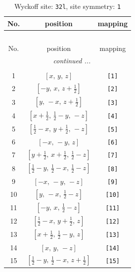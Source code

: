 \documentclass[fleqn,8pt]{jsarticle}
\begin{document}
\renewcommand{\arraystretch}{1.2}
\begin{longtable}{ccc}
\caption{Wyckoff site: {\tt 32l}, site symmetry: {\tt 1}}
 \\
 \hline \hline
No. & position & mapping \\ \hline \endfirsthead

\multicolumn{2}{l}{\tablename\ \thetable{}} \\
 \hline \hline
No. & position & mapping \\ \hline \endhead

 \hline \hline
\multicolumn{2}{r}{\footnotesize\it continued ...} \\ \endfoot

 \hline \hline
\multicolumn{2}{r}{} \\ \endlastfoot

1 & $\left[ x,\, y,\, z \right]$ & {\tt [1]} \\ \hline
2 & $\left[ - y,\, x,\, z + \frac{1}{2} \right]$ & {\tt [2]} \\ \hline
3 & $\left[ y,\, - x,\, z + \frac{1}{2} \right]$ & {\tt [3]} \\ \hline
4 & $\left[ x + \frac{1}{2},\, \frac{1}{2} - y,\, - z \right]$ & {\tt [4]} \\ \hline
5 & $\left[ \frac{1}{2} - x,\, y + \frac{1}{2},\, - z \right]$ & {\tt [5]} \\ \hline
6 & $\left[ - x,\, - y,\, z \right]$ & {\tt [6]} \\ \hline
7 & $\left[ y + \frac{1}{2},\, x + \frac{1}{2},\, \frac{1}{2} - z \right]$ & {\tt [7]} \\ \hline
8 & $\left[ \frac{1}{2} - y,\, \frac{1}{2} - x,\, \frac{1}{2} - z \right]$ & {\tt [8]} \\ \hline
9 & $\left[ - x,\, - y,\, - z \right]$ & {\tt [9]} \\ \hline
10 & $\left[ y,\, - x,\, \frac{1}{2} - z \right]$ & {\tt [10]} \\ \hline
11 & $\left[ - y,\, x,\, \frac{1}{2} - z \right]$ & {\tt [11]} \\ \hline
12 & $\left[ \frac{1}{2} - x,\, y + \frac{1}{2},\, z \right]$ & {\tt [12]} \\ \hline
13 & $\left[ x + \frac{1}{2},\, \frac{1}{2} - y,\, z \right]$ & {\tt [13]} \\ \hline
14 & $\left[ x,\, y,\, - z \right]$ & {\tt [14]} \\ \hline
15 & $\left[ \frac{1}{2} - y,\, \frac{1}{2} - x,\, z + \frac{1}{2} \right]$ & {\tt [15]} \\ \hline

\end{longtable}
\end{document}
